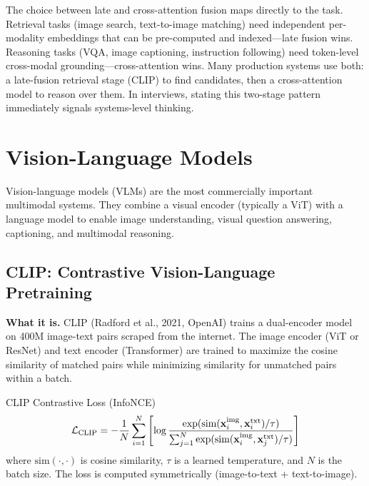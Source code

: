 \begin{keyinsight}
The choice between late and cross-attention fusion maps directly to the task. Retrieval tasks (image search, text-to-image matching) need independent per-modality embeddings that can be pre-computed and indexed---late fusion wins. Reasoning tasks (VQA, image captioning, instruction following) need token-level cross-modal grounding---cross-attention wins. Many production systems use both: a late-fusion retrieval stage (CLIP) to find candidates, then a cross-attention model to reason over them. In interviews, stating this two-stage pattern immediately signals systems-level thinking.
\end{keyinsight}

\section{Vision-Language Models}
\label{sec:vision_language_models}

Vision-language models (VLMs) are the most commercially important multimodal systems. They combine a visual encoder (typically a ViT) with a language model to enable image understanding, visual question answering, captioning, and multimodal reasoning.

\subsection{CLIP: Contrastive Vision-Language Pretraining}

\textbf{What it is.} CLIP (Radford et al., 2021, OpenAI) trains a dual-encoder model on 400M image-text pairs scraped from the internet. The image encoder (ViT or ResNet) and text encoder (Transformer) are trained to maximize the cosine similarity of matched pairs while minimizing similarity for unmatched pairs within a batch.

\begin{mathresult}{CLIP Contrastive Loss (InfoNCE)}
\begin{equation}
\mathcal{L}_{\text{CLIP}} = -\frac{1}{N}\sum_{i=1}^{N}\left[\log \frac{\exp(\text{sim}(\mathbf{x}_i^{\text{img}}, \mathbf{x}_i^{\text{txt}}) / \tau)}{\sum_{j=1}^{N}\exp(\text{sim}(\mathbf{x}_i^{\text{img}}, \mathbf{x}_j^{\text{txt}}) / \tau)}\right]
\end{equation}
where $\text{sim}(\cdot,\cdot)$ is cosine similarity, $\tau$ is a learned temperature, and $N$ is the batch size. The loss is computed symmetrically (image-to-text + text-to-image).
\end{mathresult}

